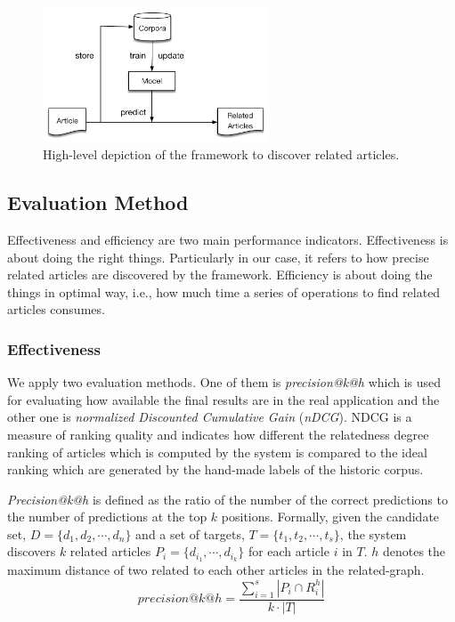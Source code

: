 \begin{figure}[!htb]
    \centering
    \includegraphics[width=0.6\textwidth]{fig/high-level.pdf}
    \caption{High-level depiction of the framework to discover related articles. }
    \label{fig:highlevel}
\end{figure}

\subsection{Evaluation Method}
\label{sec:3.3}

Effectiveness and efficiency are two main performance indicators. Effectiveness is about doing the right things. Particularly in our case, it refers to how precise related articles are discovered by the framework. Efficiency is about doing the things in optimal way, i.e., how much time a series of operations to find related articles consumes. 

\subsubsection{Effectiveness}

We apply two evaluation methods. One of them is \textit{precision@k@h} which is used for evaluating how available the final results are in the real application and the other one is \textit{normalized Discounted Cumulative Gain} (\textit{nDCG}). NDCG is a measure of ranking quality and indicates how different the relatedness degree ranking of articles which is computed by the system is compared to the ideal ranking which are generated by the hand-made labels of the historic corpus. 

\textit{Precision@k@h} is defined as the ratio of the number of the correct predictions to the number of predictions at the top $k$ positions. Formally, given the candidate set, $D = \{d_1, d_2, \cdots, d_n\}$ and a set of targets, $T = \{t_1, t_2, \cdots, t_s\}$, the system discovers $k$ related articles $P_i = \{d_{i_1}, \cdots, d_{i_k}\}$ for each article $i$ in $T$. $h$ denotes the maximum distance of two related to each other articles in the related-graph. 
\begin{equation}
    precision@k@h = \frac{\sum_{i=1}^s{|P_i \cap R_i^h|}}{k \cdot |T|}
\end{equation}

